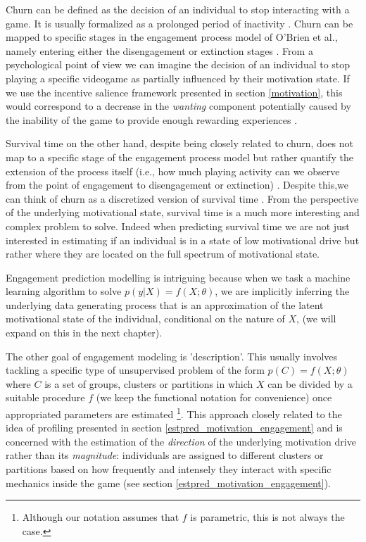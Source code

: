 Churn can be defined as the decision of an individual to stop interacting with a game. It is usually formalized as a prolonged period of inactivity \cite{hadiji2014predicting,runge2014churn, drachen2016rapid,milovsevic2017early, kim2017churn}. Churn can be mapped to specific stages in the engagement process model of O'Brien et al., namely entering either the disengagement or extinction stages \cite{o2008user}. From a psychological point of view we can imagine the decision of an individual to stop playing a specific videogame as partially influenced by their motivation state. If we use the incentive salience framework presented in section \ref{motivation}, this would correspond to a decrease in the \textit{wanting} component potentially caused by the inability of the game to provide enough rewarding experiences \cite{berridge2004motivation}. 

Survival time on the other hand, despite being closely related to churn, does not map to a specific stage of the engagement process model but rather quantify the extension of the process itself (i.e., how much playing activity can we observe from the point of engagement to disengagement or extinction) \cite{perianez2016churn, demediuk2018player, bertens2017games, kim2017churn, viljanen2018playtime}. Despite this,we can think of churn as a discretized version of survival time \cite{el2021game}. From the perspective of the underlying motivational state, survival time is a much more interesting and complex problem to solve. Indeed when predicting survival time we are not just interested in estimating  if an individual is in a state of low motivational drive but rather where they are located on the full spectrum of motivational state. 

Engagement prediction modelling is intriguing because when we task a machine learning algorithm to solve $p(y|X) = f(X; \theta)$, we are implicitly inferring the underlying data generating process that is an approximation of the latent motivational state of the individual, conditional on the nature of $X$,  (we will expand on this in the next chapter). 

The other goal of engagement modeling is 'description'. This usually involves tackling a specific type of unsupervised problem of the form $p(C) = f(X; \theta)$ where $C$ is a set of groups, clusters or partitions in which $X$ can be divided by a suitable procedure $f$ (we keep the functional notation for convenience) once appropriated parameters are estimated \cite{bishop2006pattern} \footnote{Although our notation assumes that $f$ is parametric, this is not always the case.}. This approach closely related to the idea of profiling presented in section \ref{estpred_motivation_engagement} and is concerned with the estimation of the \textit{direction} of the underlying motivation drive rather than its \textit{magnitude}: individuals are assigned to different clusters or partitions based on how frequently and intensely they interact with specific mechanics inside the game (see section \ref{estpred_motivation_engagement}). 

